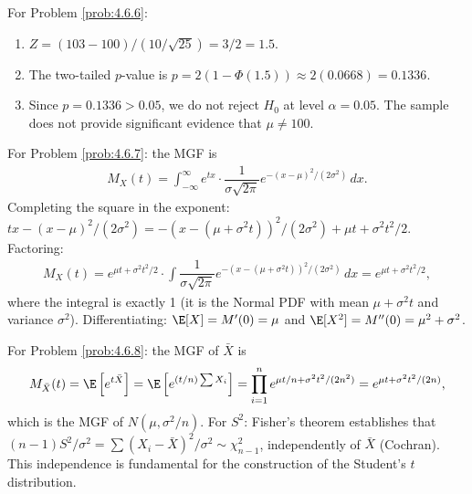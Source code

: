 \begin{solucion}
	\label{sol:4.6.6}
	For Problem \ref{prob:4.6.6}:
	\begin{enumerate}
		\item $Z = (103 - 100)/(10/\sqrt{25}) = 3/2 = 1.5$.
		\item The two-tailed $p$-value is $p = 2(1 - \Phi(1.5)) \approx 2(0.0668) = 0.1336$.
		\item Since $p = 0.1336 > 0.05$, we do not reject $H_{0}$ at level $\alpha = 0.05$. The sample does not provide significant evidence that $\mu \ne 100$.
	\end{enumerate}
\end{solucion}

\begin{solucion}
	\label{sol:4.6.7}
	For Problem \ref{prob:4.6.7}: the MGF is
	\begin{align*}
		M_{X}(t) = \int_{-\infty}^{\infty} e^{tx} \cdot \dfrac{1}{\sigma\sqrt{2\pi}} e^{-(x-\mu)^{2}/(2\sigma^{2})}\,dx.
	\end{align*}
	Completing the square in the exponent: $tx - (x-\mu)^{2}/(2\sigma^{2}) = -(x - (\mu + \sigma^{2}t))^{2}/(2\sigma^{2}) + \mu t + \sigma^{2}t^{2}/2$. Factoring:
	\begin{align*}
		M_{X}(t) = e^{\mu t + \sigma^{2}t^{2}/2} \cdot \int \dfrac{1}{\sigma\sqrt{2\pi}} e^{-(x - (\mu + \sigma^{2}t))^{2}/(2\sigma^{2})}\,dx = e^{\mu t + \sigma^{2}t^{2}/2},
	\end{align*}
	where the integral is exactly 1 (it is the Normal PDF with mean $\mu + \sigma^{2}t$ and variance $\sigma^{2}$). Differentiating: $\E[X] = M'(0) = \mu$ and $\E[X^{2}] = M''(0) = \mu^{2} + \sigma^{2}$. \quad \qedhere
\end{solucion}

\begin{solucion}
	\label{sol:4.6.8}
	For Problem \ref{prob:4.6.8}: the MGF of $\bar{X}$ is
	\begin{align*}
		M_{\bar{X}}(t) = \E\left[e^{t\bar{X}}\right] = \E\left[e^{(t/n)\sum X_{i}}\right] = \prod_{i=1}^{n} e^{\mu t/n + \sigma^{2}t^{2}/(2n^{2})} = e^{\mu t + \sigma^{2}t^{2}/(2n)},
	\end{align*}
	which is the MGF of $N(\mu, \sigma^{2}/n)$. For $S^{2}$: Fisher's theorem establishes that $(n-1)S^{2}/\sigma^{2} = \sum(X_{i} - \bar{X})^{2}/\sigma^{2} \sim \chi^{2}_{n-1}$, independently of $\bar{X}$ (Cochran). This independence is fundamental for the construction of the Student's $t$ distribution. \quad \qedhere
\end{solucion}

